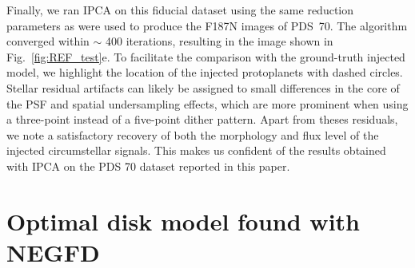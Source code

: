 \documentclass[longauth]{aa}
\newcommand{\vc}[1]{#1}
\newcommand{\new}[1]{#1}
\begin{document}
\begin{appendix}
\new{Finally, we ran IPCA on this fiducial dataset using the same reduction parameters as were used to produce the F187N images of PDS~70. The algorithm converged within $\sim$ 400 iterations, resulting in the image shown in Fig.~\ref{fig:REF_test}e. To facilitate the comparison with the ground-truth injected model, we highlight the location of the injected protoplanets with dashed circles. Stellar residual artifacts can likely be assigned to small differences in the core of the PSF \vc{and spatial undersampling effects, which are more prominent when using a three-point instead of a five-point dither pattern. Apart from theses residuals,} we note a satisfactory recovery of both the morphology and flux level of the injected circumstellar signals. This makes us confident of the results obtained with IPCA on the PDS 70 dataset reported in this paper.
}

\section{Optimal disk model found with NEGFD}\label{sec:NEGFD}


\end{appendix}
\end{document}

